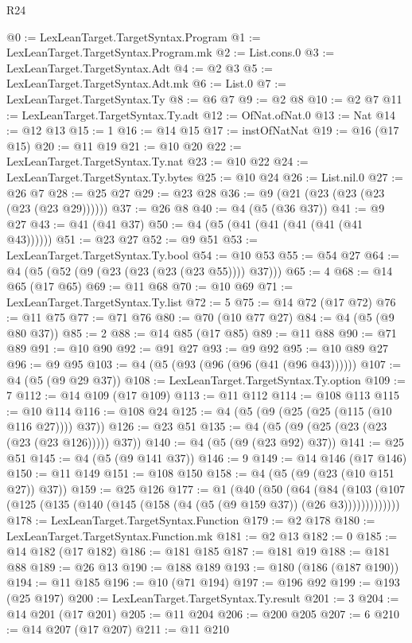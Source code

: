 \begin{lexlean}{R24}
\begin{coremodule}
@0 := LexLeanTarget.TargetSyntax.Program
@1 := LexLeanTarget.TargetSyntax.Program.mk
@2 := List.cons.{0}
@3 := LexLeanTarget.TargetSyntax.Adt
@4 := @2 @3
@5 := LexLeanTarget.TargetSyntax.Adt.mk
@6 := List.{0}
@7 := LexLeanTarget.TargetSyntax.Ty
@8 := @6 @7
@9 := @2 @8
@10 := @2 @7
@11 := LexLeanTarget.TargetSyntax.Ty.adt
@12 := OfNat.ofNat.{0}
@13 := Nat
@14 := @12 @13
@15 := 1
@16 := @14 @15
@17 := instOfNatNat
@19 := @16 (@17 @15)
@20 := @11 @19
@21 := @10 @20
@22 := LexLeanTarget.TargetSyntax.Ty.nat
@23 := @10 @22
@24 := LexLeanTarget.TargetSyntax.Ty.bytes
@25 := @10 @24
@26 := List.nil.{0}
@27 := @26 @7
@28 := @25 @27
@29 := @23 @28
@36 := @9 (@21 (@23 (@23 (@23 (@23 (@23 @29))))))
@37 := @26 @8
@40 := @4 (@5 (@36 @37))
@41 := @9 @27
@43 := @41 (@41 @37)
@50 := @4 (@5 (@41 (@41 (@41 (@41 (@41 @43))))))
@51 := @23 @27
@52 := @9 @51
@53 := LexLeanTarget.TargetSyntax.Ty.bool
@54 := @10 @53
@55 := @54 @27
@64 := @4 (@5 (@52 (@9 (@23 (@23 (@23 (@23 @55)))) @37)))
@65 := 4
@68 := @14 @65 (@17 @65)
@69 := @11 @68
@70 := @10 @69
@71 := LexLeanTarget.TargetSyntax.Ty.list
@72 := 5
@75 := @14 @72 (@17 @72)
@76 := @11 @75
@77 := @71 @76
@80 := @70 (@10 @77 @27)
@84 := @4 (@5 (@9 @80 @37))
@85 := 2
@88 := @14 @85 (@17 @85)
@89 := @11 @88
@90 := @71 @89
@91 := @10 @90
@92 := @91 @27
@93 := @9 @92
@95 := @10 @89 @27
@96 := @9 @95
@103 := @4 (@5 (@93 (@96 (@96 (@41 (@96 @43))))))
@107 := @4 (@5 (@9 @29 @37))
@108 := LexLeanTarget.TargetSyntax.Ty.option
@109 := 7
@112 := @14 @109 (@17 @109)
@113 := @11 @112
@114 := @108 @113
@115 := @10 @114
@116 := @108 @24
@125 := @4 (@5 (@9 (@25 (@25 (@115 (@10 @116 @27)))) @37))
@126 := @23 @51
@135 := @4 (@5 (@9 (@25 (@23 (@23 (@23 (@23 @126))))) @37))
@140 := @4 (@5 (@9 (@23 @92) @37))
@141 := @25 @51
@145 := @4 (@5 (@9 @141 @37))
@146 := 9
@149 := @14 @146 (@17 @146)
@150 := @11 @149
@151 := @108 @150
@158 := @4 (@5 (@9 (@23 (@10 @151 @27)) @37))
@159 := @25 @126
@177 := @1
    (@40
      (@50
        (@64
          (@84 (@103 (@107 (@125 (@135 (@140 (@145 (@158 (@4 (@5 (@9 @159 @37)) (@26 @3)))))))))))))
@178 := LexLeanTarget.TargetSyntax.Function
@179 := @2 @178
@180 := LexLeanTarget.TargetSyntax.Function.mk
@181 := @2 @13
@182 := 0
@185 := @14 @182 (@17 @182)
@186 := @181 @185
@187 := @181 @19
@188 := @181 @88
@189 := @26 @13
@190 := @188 @189
@193 := @180 (@186 (@187 @190))
@194 := @11 @185
@196 := @10 (@71 @194)
@197 := @196 @92
@199 := @193 (@25 @197)
@200 := LexLeanTarget.TargetSyntax.Ty.result
@201 := 3
@204 := @14 @201 (@17 @201)
@205 := @11 @204
@206 := @200 @205
@207 := 6
@210 := @14 @207 (@17 @207)
@211 := @11 @210

\end{coremodule}
\end{lexlean}
